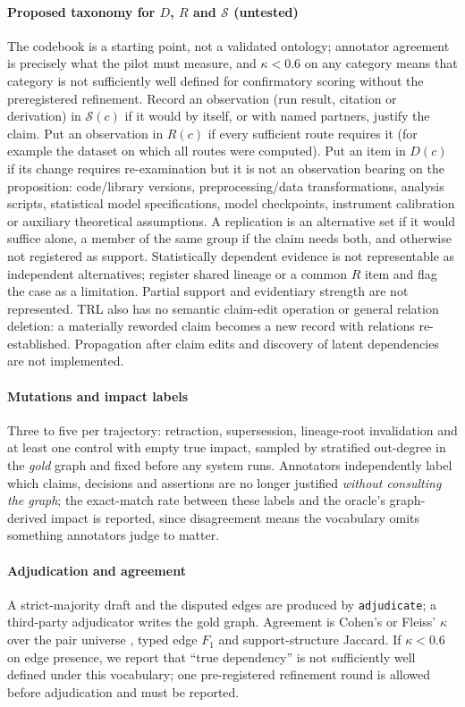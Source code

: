 \documentclass[journal]{IEEEtran}
\begin{document}
\paragraph{Proposed taxonomy for $D$, $R$ and $\mathcal{S}$ (untested)} The codebook is a starting point, not a validated ontology; annotator agreement is precisely what the pilot must measure, and $\kappa<0.6$ on any category means that category is not sufficiently well defined for confirmatory scoring without the preregistered refinement. Record an observation (run result, citation or derivation) in $\mathcal{S}(c)$ if it would by itself, or with named partners, justify the claim. Put an observation in $R(c)$ if every sufficient route requires it (for example the dataset on which all routes were computed). Put an item in $D(c)$ if its change requires re-examination but it is not an observation bearing on the proposition: code/library versions, preprocessing/data transformations, analysis scripts, statistical model specifications, model checkpoints, instrument calibration or auxiliary theoretical assumptions. A replication is an alternative set if it would suffice alone, a member of the same group if the claim needs both, and otherwise not registered as support. Statistically dependent evidence is not representable as independent alternatives; register shared lineage or a common $R$ item and flag the case as a limitation. Partial support and evidentiary strength are not represented. TRL also has no semantic claim-edit operation or general relation deletion: a materially reworded claim becomes a new record with relations re-established. Propagation after claim edits and discovery of latent dependencies are not implemented.
\paragraph{Mutations and impact labels} Three to five per trajectory: retraction, supersession, lineage-root invalidation and at least one control with empty true impact, sampled by stratified out-degree in the \emph{gold} graph and fixed before any system runs. Annotators independently label which claims, decisions and assertions are no longer justified \emph{without consulting the graph}; the exact-match rate between these labels and the oracle's graph-derived impact is reported, since disagreement means the vocabulary omits something annotators judge to matter.
\paragraph{Adjudication and agreement} A strict-majority draft and the disputed edges are produced by \texttt{adjudicate}; a third-party adjudicator writes the gold graph. Agreement is Cohen's or Fleiss' $\kappa$ over the pair universe \cite{cohen1960kappa,fleiss1971kappa}, typed edge $F_1$ and support-structure Jaccard. If $\kappa<0.6$ on edge presence, we report that ``true dependency'' is not sufficiently well defined under this vocabulary; one pre-registered refinement round is allowed before adjudication and must be reported.
\end{document}
